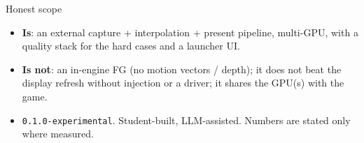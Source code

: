 \documentclass[aspectratio=169]{beamer}
\begin{document}
\begin{frame}{Honest scope}
\begin{itemize}
  \item \textbf{Is}: an external capture + interpolation + present pipeline, multi-GPU, with a quality stack
        for the hard cases and a launcher UI.
  \item \textbf{Is not}: an in-engine FG (no motion vectors / depth); it does not beat the display refresh
        without injection or a driver; it shares the GPU(s) with the game.
  \item \texttt{0.1.0-experimental}. Student-built, LLM-assisted. Numbers are stated only where measured.
\end{itemize}
\end{frame}
\end{document}
